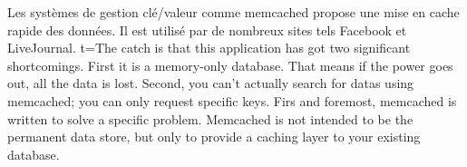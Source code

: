 Les systèmes de gestion clé/valeur comme memcached propose une mise en cache rapide des données. 
Il est utilisé par de nombreux sites tels Facebook et LiveJournal. t=The catch is that this 
application has got two significant shortcomings. First it is a memory-only database. That means
if the power goes out, all the data is lost. Second, you can't actually search for datas using 
memcached; you can only request specific keys. Firs and foremost, memcached is written to solve 
a specific problem. Memcached is not intended to be the permanent data store, but only to 
provide a caching layer to your existing database.
